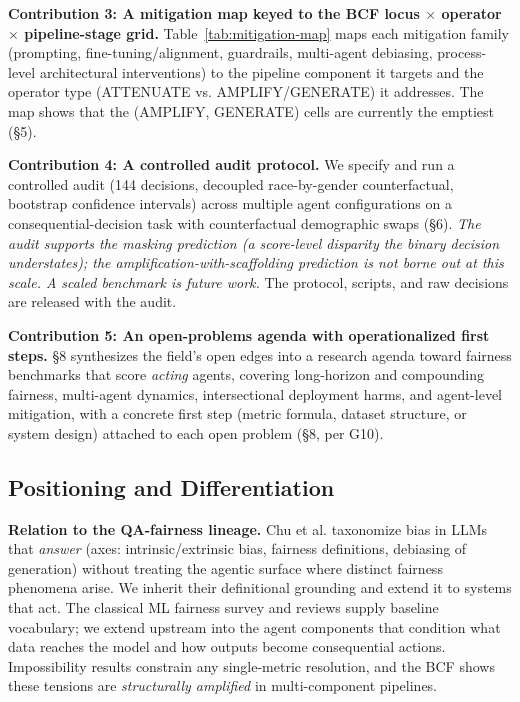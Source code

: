 \documentclass[acmsmall,nonacm]{acmart}
\begin{document}
\textbf{Contribution 3: A mitigation map keyed to the BCF locus $\times$ operator $\times$ pipeline-stage grid.} Table~\ref{tab:mitigation-map} maps each mitigation family (prompting, fine-tuning/alignment, guardrails, multi-agent debiasing, process-level architectural interventions) to the pipeline component it targets and the operator type (ATTENUATE vs. AMPLIFY/GENERATE) it addresses. The map shows that the (AMPLIFY, GENERATE) cells are currently the emptiest (\S{}5).

\textbf{Contribution 4: A controlled audit protocol.} We specify and run a controlled audit (144 decisions, decoupled race-by-gender counterfactual, bootstrap confidence intervals) across multiple agent configurations on a consequential-decision task with counterfactual demographic swaps (\S{}6). \emph{The audit supports the masking prediction (a score-level disparity the binary decision understates); the amplification-with-scaffolding prediction is not borne out at this scale. A scaled benchmark is future work.} The protocol, scripts, and raw decisions are released with the audit.

\textbf{Contribution 5: An open-problems agenda with operationalized first steps.} \S{}8 synthesizes the field's open edges into a research agenda toward fairness benchmarks that score \emph{acting} agents, covering long-horizon and compounding fairness, multi-agent dynamics, intersectional deployment harms, and agent-level mitigation, with a concrete first step (metric formula, dataset structure, or system design) attached to each open problem (\S{}8, per G10).

\subsection{Positioning and Differentiation}

\textbf{Relation to the QA-fairness lineage.} Chu et al. \cite{chu2024fairness} taxonomize bias in LLMs that \emph{answer} (axes: intrinsic/extrinsic bias, fairness definitions, debiasing of generation) without treating the agentic surface where distinct fairness phenomena arise. We inherit their definitional grounding \cite{dwork2012fairness,hardt2016equality,kusner2017counterfactual,gallegos2024bias} and extend it to systems that act. The classical ML fairness survey \cite{mehrabi2021survey} and reviews \cite{pessach2022review,caton2024fairness} supply baseline vocabulary; we extend upstream into the agent components that condition what data reaches the model and how outputs become consequential actions. Impossibility results \cite{kleinberg2017inherent,chouldechova2017fair} constrain any single-metric resolution, and the BCF shows these tensions are \emph{structurally amplified} in multi-component pipelines.
\end{document}
